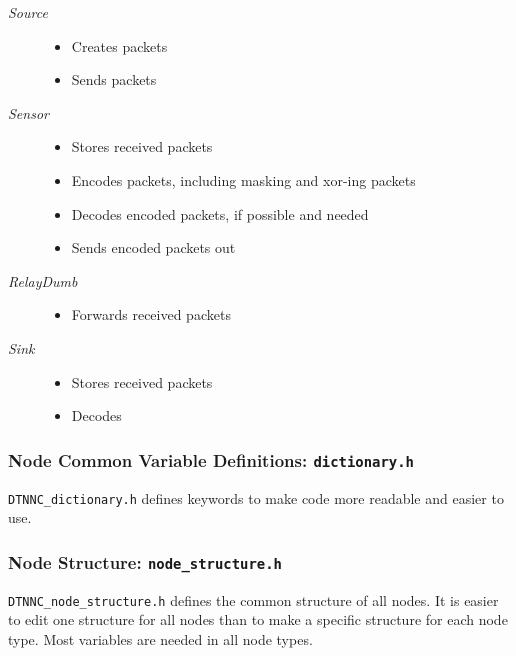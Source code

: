 \documentclass[a4paper,twoside]{article}
\begin{document}
\begin{description}
\item[\emph{Source}] \hfill
  \begin{itemize}
  \item Creates packets
  \item Sends packets
  \end{itemize}
\newpage
\item[\emph{Sensor}] \hfill
  \begin{itemize}
  \item Stores received packets
  \item Encodes packets, including masking and xor-ing packets
  \item Decodes encoded packets, if possible and needed
  \item Sends encoded packets out
  \end{itemize}
\item[\emph{RelayDumb}] \hfill
  \begin{itemize}
  \item Forwards received packets
  \end{itemize}
\item[\emph{Sink}] \hfill
  \begin{itemize}
  \item Stores received packets
  \item Decodes 
  \end{itemize}
\end{description}

\subsubsection{Node Common Variable Definitions: \texttt{dictionary.h}}

\texttt{DTNNC\_dictionary.h} defines keywords to make code more readable and easier to use.



\subsubsection{Node Structure: \texttt{node\_structure.h}}

\texttt{DTNNC\_node\_structure.h} defines the common structure of all nodes. It is easier to edit one structure for all nodes than to make a specific structure for each node type. Most variables are needed in all node types.
\end{document}
